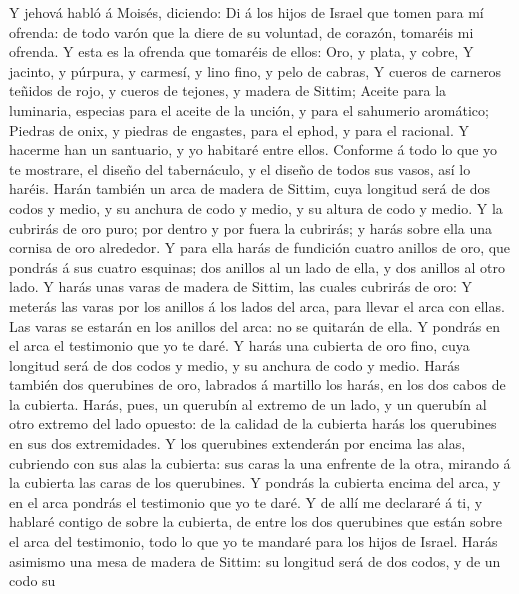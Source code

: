  Y jehová habló á Moisés, diciendo:  Di á los
hijos de Israel que tomen para mí ofrenda: de todo varón que la diere de
su voluntad, de corazón, tomaréis mi ofrenda.  Y esta es la
ofrenda que tomaréis de ellos: Oro, y plata, y cobre,  Y
jacinto, y púrpura, y carmesí, y lino fino, y pelo de cabras,
 Y cueros de carneros teñidos de rojo, y cueros de tejones,
y madera de Sittim;  Aceite para la luminaria, especias para
el aceite de la unción, y para el sahumerio aromático; 
Piedras de onix, y piedras de engastes, para el ephod, y para el
racional.  Y hacerme han un santuario, y yo habitaré entre
ellos.  Conforme á todo lo que yo te mostrare, el diseño del
tabernáculo, y el diseño de todos sus vasos, así lo haréis.
 Harán también un arca de madera de Sittim, cuya longitud
será de dos codos y medio, y su anchura de codo y medio, y su altura de
codo y medio.  Y la cubrirás de oro puro; por dentro y por
fuera la cubrirás; y harás sobre ella una cornisa de oro alrededor.
 Y para ella harás de fundición cuatro anillos de oro, que
pondrás á sus cuatro esquinas; dos anillos al un lado de ella, y dos
anillos al otro lado.  Y harás unas varas de madera de
Sittim, las cuales cubrirás de oro:  Y meterás las varas
por los anillos á los lados del arca, para llevar el arca con ellas.
 Las varas se estarán en los anillos del arca: no se
quitarán de ella.  Y pondrás en el arca el testimonio que
yo te daré.  Y harás una cubierta de oro fino, cuya
longitud será de dos codos y medio, y su anchura de codo y medio.
 Harás también dos querubines de oro, labrados á martillo
los harás, en los dos cabos de la cubierta.  Harás, pues,
un querubín al extremo de un lado, y un querubín al otro extremo del
lado opuesto: de la calidad de la cubierta harás los querubines en sus
dos extremidades.  Y los querubines extenderán por encima
las alas, cubriendo con sus alas la cubierta: sus caras la una enfrente
de la otra, mirando á la cubierta las caras de los querubines.
 Y pondrás la cubierta encima del arca, y en el arca
pondrás el testimonio que yo te daré.  Y de allí me
declararé á ti, y hablaré contigo de sobre la cubierta, de entre los dos
querubines que están sobre el arca del testimonio, todo lo que yo te
mandaré para los hijos de Israel.  Harás asimismo una mesa
de madera de Sittim: su longitud será de dos codos, y de un codo su
